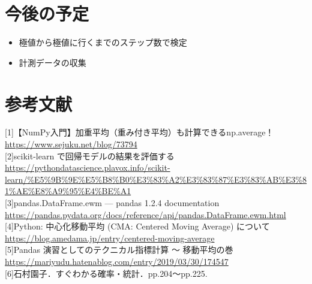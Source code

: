 \section{今後の予定}
\begin{itemize}
    \item 極値から極値に行くまでのステップ数で検定
    \item 計測データの収集
\end{itemize}

\section{参考文献}
    [1]【NumPy入門】加重平均（重み付き平均）も計算できるnp.average！ \\
    \url{https://www.sejuku.net/blog/73794} \\

    [2]scikit-learn で回帰モデルの結果を評価する \\
    \url{https://pythondatascience.plavox.info/scikit-learn/%E5%9B%9E%E5%B8%B0%E3%83%A2%E3%83%87%E3%83%AB%E3%81%AE%E8%A9%95%E4%BE%A1}\\

    [3]pandas.DataFrame.ewm — pandas 1.2.4 documentation \\
    \url{https://pandas.pydata.org/docs/reference/api/pandas.DataFrame.ewm.html} \\

    [4]Python: 中心化移動平均 (CMA: Centered Moving Average) について \\
    \url{https://blog.amedama.jp/entry/centered-moving-average}\\

    [5]Pandas 演習としてのテクニカル指標計算 〜 移動平均の巻 \\
    \url{https://mariyudu.hatenablog.com/entry/2019/03/30/174547} \\

    [6]石村園子．すぐわかる確率・統計．pp.204〜pp.225.\\
